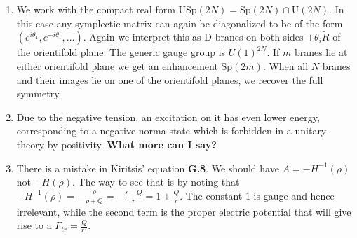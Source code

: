 \documentclass[11pt, class=article, crop=false]{standalone}
\begin{document}
\begin{enumerate}
	
	\item %
	We work with the compact real form $\mathrm{USp}(2N) = \mathrm{Sp}(2N) \cap \mathrm U(2N)$. In this case any symplectic matrix can again be diagonalized to be of the form $(e^{i \theta_1}, e^{-i\theta_1}, \dots )$. Again we interpret this as D-branes on both sides $\pm \theta_i \tilde R$ of the orientifold plane. The generic gauge group is $U(1)^{2N}$. If $m$ branes lie at either orientifold plane we get an enhancement $\mathrm{Sp}(2m)$. When all $N$ branes and their images lie on one of the orientifold planes, we recover the full symmetry. 
	
	\item Due to the negative tension, an excitation on it has even lower energy, corresponding to a negative norma state which is forbidden in a unitary theory by positivity. \textbf{What more can I say? }
	
	\item There is a mistake in Kiritsis' equation \textbf{G.8}. We should have $A = -H^{-1}(\rho)$ not $-H(\rho)$. The way to see that is by noting that $-H^{-1}(\rho) = -\frac{\rho}{\rho+Q} = -\frac{r-Q}{r} = 1 + \frac{Q}{r}$. The constant $1$ is gauge and hence irrelevant, while the second term is the proper electric potential that will give rise to a $F_{tr} = \frac{Q}{r^2}$.
	

\end{enumerate}
\end{document}
